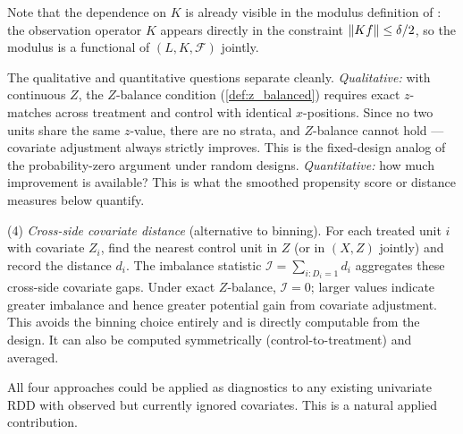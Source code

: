 {	Note that the dependence on $K$ is already visible in the modulus definition of \textcite{armstrong_optimal_2018}: the observation operator $K$ appears directly in the constraint $\lVert Kf\rVert \leq \delta/2$, so the modulus is a functional of $(L, K, \mathcal{F})$ jointly.

	The qualitative and quantitative questions separate cleanly.  \emph{Qualitative:} with continuous $Z$, the $Z$-balance condition (\cref{def:z_balanced}) requires exact $z$-matches across treatment and control with identical $x$-positions.  Since no two units share the same $z$-value, there are no strata, and $Z$-balance cannot hold --- covariate adjustment always strictly improves.  This is the fixed-design analog of the probability-zero argument under random designs.  \emph{Quantitative:} how much improvement is available?  This is what the smoothed propensity score or distance measures below quantify.

	(4) \emph{Cross-side covariate distance} (alternative to binning).  For each treated unit $i$ with covariate $Z_i$, find the nearest control unit in $Z$ (or in $(X, Z)$ jointly) and record the distance $d_i$.  The imbalance statistic $\mathcal{I} = \sum_{i : D_i = 1} d_i$ aggregates these cross-side covariate gaps.  Under exact $Z$-balance, $\mathcal{I} = 0$; larger values indicate greater imbalance and hence greater potential gain from covariate adjustment.  This avoids the binning choice entirely and is directly computable from the design.  It can also be computed symmetrically (control-to-treatment) and averaged.

	All four approaches could be applied as diagnostics to any existing univariate RDD with observed but currently ignored covariates.  This is a natural applied contribution.}

